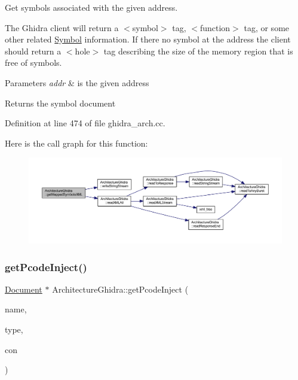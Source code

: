 Get symbols associated with the given address. 

The Ghidra client will return a $<$symbol$>$ tag, $<$function$>$ tag, or some other related \mbox{\hyperlink{class_symbol}{Symbol}} information. If there no symbol at the address the client should return a $<$hole$>$ tag describing the size of the memory region that is free of symbols. 
\begin{DoxyParams}{Parameters}
{\em addr} & is the given address \\
\hline
\end{DoxyParams}
\begin{DoxyReturn}{Returns}
the symbol document 
\end{DoxyReturn}


Definition at line 474 of file ghidra\+\_\+arch.\+cc.

Here is the call graph for this function\+:
\nopagebreak
\begin{figure}[H]
\begin{center}
\leavevmode
\includegraphics[width=350pt]{class_architecture_ghidra_a03d6804fba40e0c09e6be5e3ad5f8723_cgraph}
\end{center}
\end{figure}
\mbox{\label{class_architecture_ghidra_a68392af0ec054e9c2a3d2f4774bfce28}} 
\subsubsection{\texorpdfstring{getPcodeInject()}{getPcodeInject()}}
{\footnotesize\ttfamily \mbox{\hyperlink{class_document}{Document}} $\ast$ Architecture\+Ghidra\+::get\+Pcode\+Inject (\begin{DoxyParamCaption}\item[{const string \&}]{name,  }\item[{int4}]{type,  }\item[{const \mbox{\hyperlink{class_inject_context}{Inject\+Context}} \&}]{con }\end{DoxyParamCaption})}




